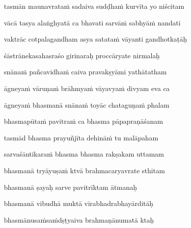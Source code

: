 \ujvers\nemsloka 
tasmān maunavrata\.m sadaiva sudḍha\.m kurvīta yo niścitam
\dontdisplaylinenum

\nemslokab 
vācā tasya alaṅghyatā ca bhavati sarvā\.m sabhyā\.m nandati \danda\dontdisplaylinenum

\nemslokac 
vaktrāc cotpalagandham asya satata\.m vāyanti gandhotkaṭāḥ
\dontdisplaylinenum

\nemslokad 
śāstrānekasahasraśo girinaraḥ proccāryate nirmalaḥ \veg\dontdisplaylinenum

\vers


snāna\.m pañcavidha\.m caiva pravakṣyāmi yathātatham\thinspace{\dandab} \dontdisplaylinenum

āgneya\.m vāruṇa\.m brāhmya\.m vāyavya\.m divyam eva ca \veg\dontdisplaylinenum

āgneya\.m bhasmanā snāna\.m toyāc chataguṇa\.m phalam\thinspace{\dandab} \dontdisplaylinenum

bhasmapūta\.m pavitra\.m ca bhasma pāpapraṇāśanam \veg\dontdisplaylinenum

tasmād bhasma prayuñjīta dehinā\.m tu malāpaham\thinspace{\dandab} \dontdisplaylinenum

sarvaśāntikara\.m bhasma bhasma rakṣakam uttamam \veg\dontdisplaylinenum

bhasmanā tryāyuṣa\.m ktvā brahmacaryavrate sthitam\thinspace{\dandab} \dontdisplaylinenum

bhasmanā ṣayaḥ sarve pavitrīktam ātmanaḥ \veg\dontdisplaylinenum

bhasmanā vibudhā muktā vīrabhadrabhayārditāḥ\thinspace{\dandab} \dontdisplaylinenum

bhasmānusa\.msa\.mdṣṭyaiva brahmaṇānumatā ktaḥ \veg\dontdisplaylinenum

